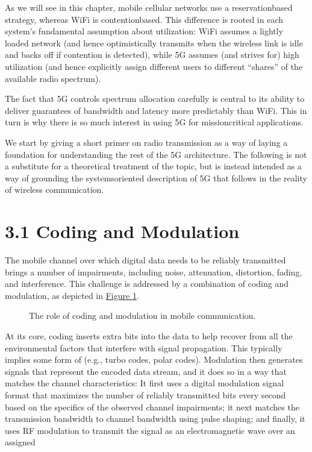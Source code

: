 \documentclass[a4paper,11pt,english]{sphinxmanual}
\let\sphinxpxdimen\pdfpxdimen\else\newdimen\sphinxpxdimen
\begin{document}
\sphinxAtStartPar
As we will see in this chapter, mobile cellular networks use a
reservation\sphinxhyphen{}based strategy, whereas Wi\sphinxhyphen{}Fi is contention\sphinxhyphen{}based. This
difference is rooted in each system’s fundamental assumption about
utilization: Wi\sphinxhyphen{}Fi assumes a lightly loaded network (and hence
optimistically transmits when the wireless link is idle and backs off
if contention is detected), while 5G assumes (and strives for) high
utilization (and hence explicitly assign different users to different
“shares” of the available radio spectrum).

\sphinxAtStartPar
The fact that 5G controls spectrum allocation carefully is central to
its ability to deliver guarantees of bandwidth and latency more
predictably than Wi\sphinxhyphen{}Fi. This in turn is why there is so much interest
in using 5G for mission\sphinxhyphen{}critical applications.

\sphinxAtStartPar
We start by giving a short primer on radio transmission as a way of
laying a foundation for understanding the rest of the 5G architecture.
The following is not a substitute for a theoretical treatment of the topic,
but is instead intended as a way of grounding the systems\sphinxhyphen{}oriented
description of 5G that follows in the reality of wireless communication.


\section{3.1 Coding and Modulation}
\label{\detokenize{radio:coding-and-modulation}}
\sphinxAtStartPar
The mobile channel over which digital data needs to be reliably
transmitted brings a number of impairments, including noise,
attenuation, distortion, fading, and interference. This challenge is
addressed by a combination of coding and modulation, as depicted in
\hyperref[\detokenize{radio:fig-modulation}]{Figure \ref{\detokenize{radio:fig-modulation}}}.

\begin{figure}[ht]
\centering
\capstart

\noindent\sphinxincludegraphics[width=500\sphinxpxdimen]{{Slide141}.png}
\caption{The role of coding and modulation in mobile communication.}\label{\detokenize{radio:id5}}\label{\detokenize{radio:fig-modulation}}\end{figure}

\sphinxAtStartPar
At its core, coding inserts extra bits into the data to help recover
from all the environmental factors that interfere with signal
propagation. This typically implies some form of  (e.g., turbo codes, polar codes). Modulation then
generates signals that represent the encoded data stream, and it does
so in a way that matches the channel characteristics: It first uses a
digital modulation signal format that maximizes the number of reliably
transmitted bits every second based on the specifics of the observed
channel impairments; it next matches the transmission
bandwidth to channel bandwidth using pulse shaping; and finally, it
uses RF modulation to transmit the signal as an electromagnetic wave
over an assigned 
\end{document}
